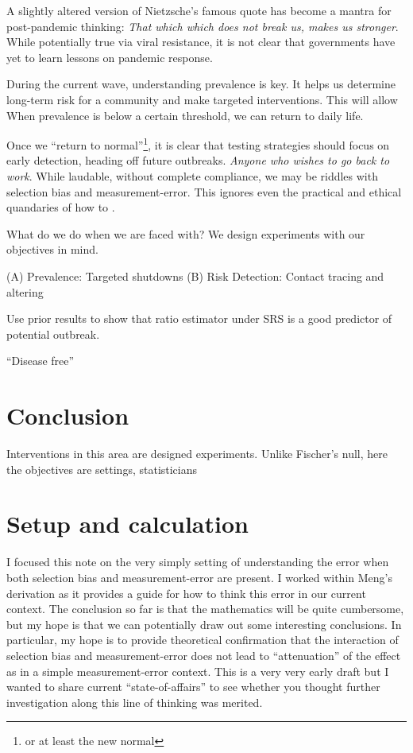 \documentclass[12pt]{article}
\numberwithin{equation}{section}
\theoremstyle{plain}
\begin{document}
A slightly altered version of Nietzsche's famous quote has become a mantra for post-pandemic thinking: \emph{That which which does not break us, makes us stronger}.  While potentially true via viral resistance, it is not clear that governments have yet to learn lessons on pandemic response.

During the current wave, understanding prevalence is key.  It helps us determine long-term risk for a community and make targeted interventions.  This will allow
When prevalence is below a certain threshold, we can return to daily life.

Once we ``return to normal''\footnote{or at least the new normal}, it is clear that testing strategies should focus on early detection, heading off future outbreaks.
\emph{Anyone who wishes to go back to work}.  While laudable, without complete compliance, we may be riddles with selection bias and measurement-error.  This ignores even the practical and ethical quandaries of how to .

What do we do when we are faced with?  We design experiments with our objectives in mind.

(A) Prevalence: Targeted shutdowns
(B) Risk Detection: Contact tracing and altering

Use prior results to show that ratio estimator under SRS is a good predictor of potential outbreak.

``Disease free''


\section{Conclusion}

Interventions in this area are designed experiments.  Unlike Fischer's null, here the objectives are settings, statisticians

\appendix

\section{Setup and calculation}

I focused this note on the very simply setting of understanding the error when both selection bias and measurement-error are present.  I worked within Meng's derivation as it provides a guide for how to think this error in our current context.  The conclusion so far is that the mathematics will be quite cumbersome, but my hope is that we can potentially draw out some interesting conclusions.  In particular, my hope is to provide theoretical confirmation that the interaction of selection bias and measurement-error does not lead to ``attenuation'' of the effect as in a simple measurement-error context. This is a very very early draft but I wanted to share current ``state-of-affairs'' to see whether you thought further investigation along this line of thinking was merited.
\end{document}
